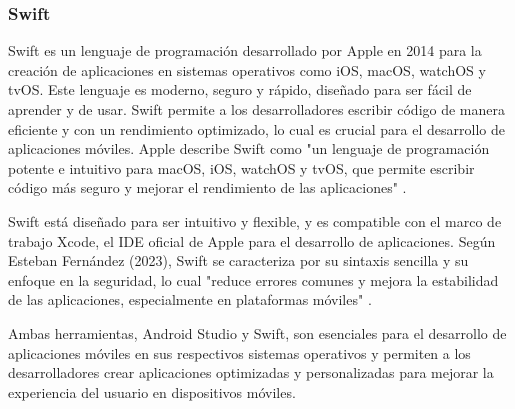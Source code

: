 \subsubsection{Swift}

Swift es un lenguaje de programación desarrollado por Apple en 2014 para la creación de aplicaciones en sistemas operativos como iOS, macOS, watchOS y tvOS. Este lenguaje es moderno, seguro y rápido, diseñado para ser fácil de aprender y de usar. Swift permite a los desarrolladores escribir código de manera eficiente y con un rendimiento optimizado, lo cual es crucial para el desarrollo de aplicaciones móviles. Apple describe Swift como "un lenguaje de programación potente e intuitivo para macOS, iOS, watchOS y tvOS, que permite escribir código más seguro y mejorar el rendimiento de las aplicaciones" \parencite{apple2023}.

Swift está diseñado para ser intuitivo y flexible, y es compatible con el marco de trabajo Xcode, el IDE oficial de Apple para el desarrollo de aplicaciones. Según Esteban Fernández (2023), Swift se caracteriza por su sintaxis sencilla y su enfoque en la seguridad, lo cual "reduce errores comunes y mejora la estabilidad de las aplicaciones, especialmente en plataformas móviles" \parencite{fernandez2023}.

Ambas herramientas, Android Studio y Swift, son esenciales para el desarrollo de aplicaciones móviles en sus respectivos sistemas operativos y permiten a los desarrolladores crear aplicaciones optimizadas y personalizadas para mejorar la experiencia del usuario en dispositivos móviles.

